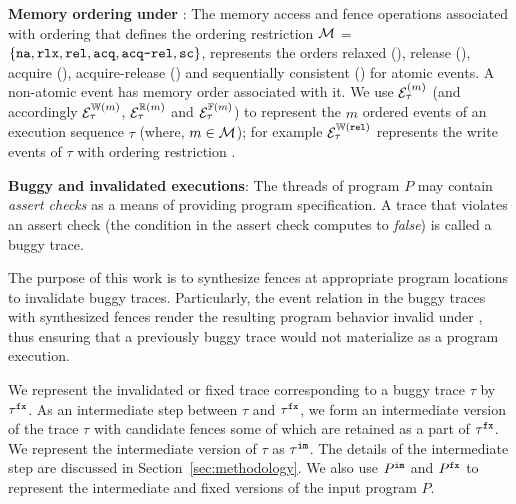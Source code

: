 \noindent
{\bf Memory ordering under \cc}: 
 The memory access and fence operations
   
associated with  ordering 
that defines the ordering restriction 
%
%
 $\mathcal{M}$ = $\{ \texttt{na}, \texttt{rlx}, \texttt{rel}, \texttt{acq}, \texttt{acq-rel}, \texttt{sc} \}$, 
represents the orders relaxed (\rlx), release (\rel), acquire (\acq),
acquire-release (\acqrel) and sequentially consistent (\sc) for
atomic events. A non-atomic event has \na memory order associated with 
it.
%
We use $\mathcal{E}^{(m)}_\tau$ (and accordingly $\mathcal{E}^{\mathbb{W}(m)}_\tau$, 
$\mathcal{E}^{\mathbb{R}(m)}_\tau$ and $\mathcal{E}^{\mathbb{F}(m)}_\tau$) to represent the $m$
ordered events of an execution sequence $\tau$ (where, $m \in \mathcal{M}$);
for example $\mathcal{E}^{\mathbb{W}(\texttt{rel})}_\tau$ represents the write events of 
$\tau$ with ordering restriction \rel.


\noindent
{\bf Buggy and invalidated executions}: The threads of 
program $P$ may contain {\em assert checks} as a means of providing
program specification. A trace that violates an 
assert check (\ie the condition in the assert check computes to
{\em false}) is called a buggy trace.

The purpose of this work is to synthesize \cc fences at appropriate
program locations to invalidate buggy traces. Particularly, the
event relation in the buggy traces with synthesized fences
render the resulting program behavior invalid under \cc, thus ensuring
that a previously buggy trace would not materialize as a 
\cc program execution.

We represent the invalidated or fixed trace corresponding to a 
buggy trace $\tau$ by ${\tau}^{\mathtt{fx}}$. 
%
As an intermediate step between $\tau$ and ${\tau}^{\mathtt{fx}}$, we form an 
intermediate version of the trace $\tau$ with candidate fences
some of which are retained as a part of ${\tau}^{\mathtt{fx}}$. We represent
the intermediate version of $\tau$ as ${\tau}^{\mathtt{im}}$. The details
of the intermediate step are discussed in Section~\ref{sec:methodology}.
%
We also use ${P}^{\mathtt{im}}$ and ${P}^{\mathtt{fx}}$ to represent the intermediate and
fixed versions of the input program $P$.